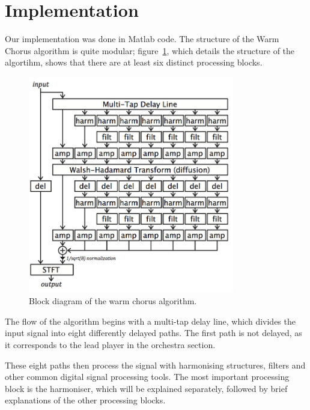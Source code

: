 \section{Implementation}
Our implementation was done in Matlab code. The structure of the Warm Chorus algorithm is quite modular; figure~\ref{fig:struct}, which details the structure of the algortihm, shows that there are at least six distinct processing blocks.
\begin{figure}[ht]
\centering
\includegraphics[width= 9cm]{Structure.png}
\caption{Block diagram of the warm chorus algorithm. \cite{dudas}}
\label{fig:struct}
\end{figure}

The flow of the algorithm begins with a multi-tap delay line, which divides the input signal into eight differently delayed paths. The first path is not delayed, as it corresponds to the lead player in the orchestra section.

These eight paths then process the signal with harmonising structures, filters and other common digital signal processing tools. The most important processing block is the harmoniser, which will be explained separately, followed by brief explanations of the other processing blocks. 
